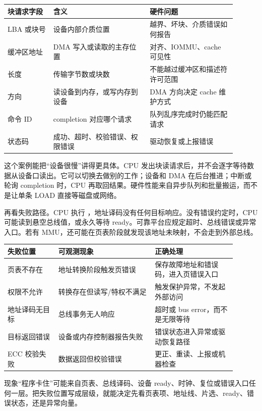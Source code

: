 \begin{longtable}{L{0.18\linewidth}L{0.38\linewidth}L{0.34\linewidth}}
\toprule
块请求字段 & 含义 & 硬件问题 \\
\midrule
LBA 或块号 & 设备内部介质位置 & 越界、坏块、介质错误如何报告 \\
缓冲区地址 & DMA 写入或读取的主存位置 & 对齐、IOMMU、cache 可见性 \\
长度 & 传输字节数或块数 & 不能越过缓冲区和描述符许可范围 \\
方向 & 读设备到内存，或写内存到设备 & DMA 方向决定 cache 维护方式 \\
命令 ID & completion 对应哪个请求 & 队列乱序完成时仍能匹配请求 \\
状态码 & 成功、超时、校验错误、权限错误 & 驱动恢复或上报错误 \\
\bottomrule
\end{longtable}

这个案例能把“设备很慢”讲得更具体。CPU 发出块读请求后，并不会逐字等待数据从设备口读出。它可以切换去做别的工作；设备和 DMA 在后台推进；中断或轮询 completion 时，CPU 再取回结果。硬件性能来自异步队列和批量搬运，而不是让单条 LOAD 直接等磁盘或网络。

再看失败路径。CPU 执行 ，地址译码没有任何目标响应。没有错误约定时，CPU 可能读到悬空总线值，或永久等待 ready。可靠平台应规定超时、总线错误或异常入口。若有 MMU，还可能在页表阶段就发现该地址未映射，不会走到外部总线。

\begin{longtable}{L{0.2\linewidth}L{0.38\linewidth}L{0.32\linewidth}}
\toprule
失败位置 & 可观测现象 & 正确处理 \\
\midrule
页表不存在 & 地址转换阶段触发页错误 & 保存故障地址和错误码，进入页错误入口 \\
权限不允许 & 转换存在但读写/特权不满足 & 触发保护异常，不发起外部访问 \\
地址译码无目标 & 总线事务无人响应 & 超时或 bus error，而不是无限等待 \\
目标返回错误 & 设备或内存控制器报告失败 & 错误状态进入异常或驱动恢复路径 \\
ECC 校验失败 & 数据返回但校验错误 & 更正、重读、上报或机器检查 \\
\bottomrule
\end{longtable}

现象“程序卡住”可能来自页表、总线译码、设备 ready、时钟、复位或错误入口任何一层。把失败位置写成层级，就能决定先看页表项、地址线、片选、ready、错误状态，还是异常向量。

